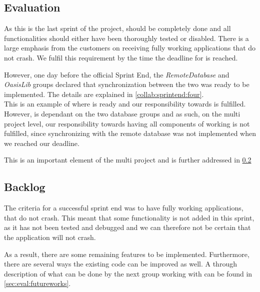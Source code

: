 \subsection{Evaluation}

As this is the last sprint of the project, \launcher should be completely done and all functionalities should either have been thoroughly tested or disabled.
There is a large emphasis from the customers on receiving  fully working applications that do not crash.
We fulfil this requirement by the time the deadline for \launcher is reached.

However, one day before the official Sprint End, the \textit{RemoteDatabase} and \textit{OasisLib} groups declared that synchronization between the two was ready to be implemented.
The details are explained in \cref{collab:sprintend:four}.\\

This is an example of where \launcher is ready and our responsibility towards \launcher is fulfilled.
However, \launcher is dependant on the two database groups and as such, on the multi project level, our responsibility towards having all components of \launcher working is not fulfilled, since synchronizing with the remote database was not implemented when we reached our deadline.

This is an important element of the multi project and is further addressed in \cref{}

\subsection{Backlog}

The criteria for a successful sprint end was to have fully working applications, that do not crash.
This meant that some functionality is not added in this sprint, as it has not been tested and debugged and we can therefore not be certain that the application will not crash.

As a result, there are some remaining features to be implemented.
Furthermore, there are several ways the existing code can be improved as well.
A through description of what can be done by the next group working with \launcher can be found in \cref{sec:eval:futureworks}.